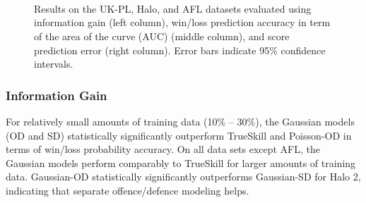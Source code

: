 \documentclass[runningheads,a4paper]{llncs}
\begin{document}
\begin{center}
\begin{figure}[t!]
 \centering
 \\
 \\
 \\
\vspace{-0.3cm}
\caption{\small Results on the UK-PL, Halo, and AFL datasets evaluated
using information gain (left column), win/loss prediction accuracy in
term of the area of the curve (AUC) (middle column), and score
prediction error (right column).  Error bars indicate
95\% confidence intervals.}
\vspace{-0.3cm}
\label{fig:Results}
\end{figure}
\end{center}

\subsubsection{Information Gain}

For relatively small amounts of training data (10\% -- 30\%), the
Gaussian models (OD and SD) statistically significantly outperform
TrueSkill and Poisson-OD in terms of win/loss probability accuracy.
On all data sets except AFL, the Gaussian models perform comparably to
TrueSkill for larger amounts of training data.  Gaussian-OD
statistically significantly outperforms Gaussian-SD for Halo 2,
indicating that separate offence/defence modeling helps.
\end{document}
